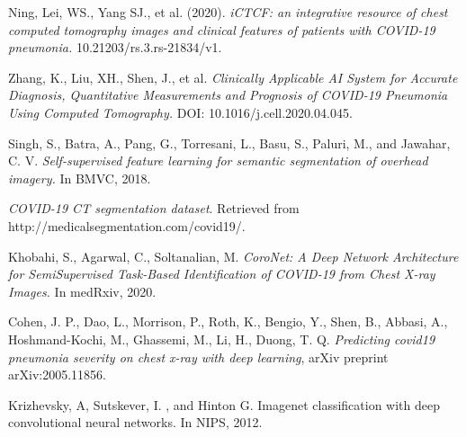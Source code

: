 \begin{thebibliography}{1}
	 Ning, Lei, WS., Yang SJ., et al. (2020). \textit{iCTCF: an integrative resource of chest computed tomography images and clinical features of patients with COVID-19 pneumonia.} 10.21203/rs.3.rs-21834/v1.

	 Zhang, K., Liu, XH., Shen, J., et al. \textit{Clinically Applicable AI System for Accurate Diagnosis, Quantitative Measurements and Prognosis of COVID-19 Pneumonia Using Computed Tomography.} DOI: 10.1016/j.cell.2020.04.045.
	
	  Singh, S., Batra, A., Pang, G., Torresani, L., Basu, S.,  Paluri, M., and Jawahar, C. V.  \textit{Self-supervised feature learning for semantic segmentation of
	overhead imagery.} In BMVC, 2018.

	 \textit{COVID-19 CT segmentation dataset}. Retrieved from http://medicalsegmentation.com/covid19/.
	
	 Khobahi, S., Agarwal, C., Soltanalian, M. \textit{CoroNet: A Deep Network Architecture for
		SemiSupervised Task-Based Identification of COVID-19 from Chest X-ray Images.} In medRxiv, 2020.
	
	 Cohen, J. P., Dao, L., Morrison, P., Roth, K., Bengio, Y., Shen, B., Abbasi, A., Hoshmand-Kochi, M., Ghassemi, M., Li, H., Duong, T. Q. \textit{Predicting covid19 pneumonia severity on chest x-ray with deep learning}, arXiv preprint arXiv:2005.11856.
	
	Krizhevsky, A, Sutskever, I. , and Hinton G. Imagenet classification with deep convolutional neural networks. In NIPS, 2012.

\end{thebibliography}
